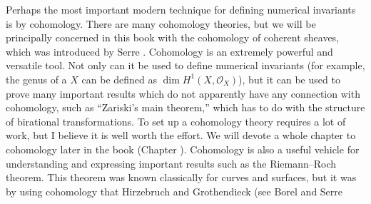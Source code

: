 {Perhaps the most important modern technique for defining numerical invariants is by cohomology. There are many cohomology theories, but we will be principally concerned in this book with the cohomology of coherent sheaves, which was introduced by Serre . Cohomology is an extremely powerful and versatile tool. Not only can it be used to define numerical invariants (for example, the genus of a \hypertarget{err-I-8-cohomological-genus}{} $X$ can be defined as $\dim H^1(X,\mathcal O_X)$), but it can be used to prove many important results which do not apparently have any connection with cohomology, such as \textquotedblleft{}Zariski's main theorem,\textquotedblright{} which has to do with the structure of birational transformations. To set up a cohomology theory requires a lot of work, but I believe it is well worth the effort. We will devote a whole chapter to cohomology later in the book (Chapter ). Cohomology is also a useful vehicle for understanding and expressing important results such as the Riemann--Roch theorem. This theorem was known classically for curves and surfaces, but it was by using cohomology that Hirzebruch  and Grothendieck (see Borel and Serre}
